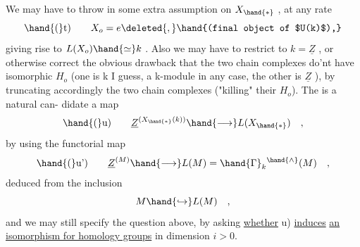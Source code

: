 We may have to throw in some extra assumption on $X_{\hand{*}}$ , at any rate
\[ \hand{(}\text{t)} \qquad X_o = e \deleted{,} \hand{(final object of $U(k)$),} \]
 giving rise to  $L(X_o)\hand{\simeq} k$ . Also we may
have to restrict to $k=\underline{Z}$ , or otherwise correct the obvious drawback that
the two chain complexes do'nt have isomorphic $H_o$ (one is k I guess,
a k-module in any case, the other is $\underline{Z}$ ), by truncating accordingly
the two chain complexes ("killing" their $H_o$). The is a natural can-%
didate  a map
\[ \hand{(}\text{u)} \qquad \underline{Z}^{(X_{\hand{*}}(k))} \hand{\longrightarrow} L(X_{\hand{*}}) \quad , \]
by using the functorial map
\[ \hand{(}\text{u')} \qquad \underline{Z}^{(M)} \hand{\longrightarrow} L(M) = \hand{\Gamma}_k{}^{\hand{\wedge}}(M) \quad , \]
deduced from the inclusion 
\[ M \hand{\hookrightarrow} L(M) \quad , \]
and we may still specify the question above, by asking \uline{whether} \hand{(}u) \uline{induces}
\uline{an isomorphism for homology groups} in dimension $i>0$.


